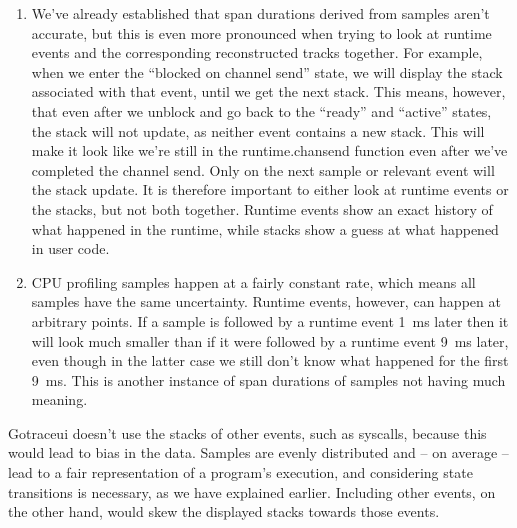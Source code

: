 \documentclass[10pt,letterpaper,oneside,openany,showtrims,draft]{memoir}
\newcommand{\code}[1]{{\ttfamily\mbox{#1}}}
\begin{document}
\begin{enumerate}
\item We've already established that span durations derived from samples aren't accurate, but this is even more
  pronounced when trying to look at runtime events and the corresponding reconstructed tracks together. For
  example, when we enter the \enquote{blocked on channel send} state, we will display the stack associated with that
  event, until we get the next stack. This means, however, that even after we unblock and go back to the
  \enquote{ready} and \enquote{active} states, the stack will not update, as neither event contains a new stack. This
  will make it look like we're still in the \code{runtime.chansend} function even after we've completed the channel
  send. Only on the next sample or relevant event will the stack update. It is therefore important to either look at
  runtime events or the stacks, but not both together. Runtime events show an exact history of what happened in
  the runtime, while stacks show a guess at what happened in user code.

\item CPU profiling samples happen at a fairly constant rate, which means all samples have the same uncertainty.
  Runtime events, however, can happen at arbitrary points. If a sample is followed by a runtime event \unit{1 ms}
  later then it will look much smaller than if it were followed by a runtime event \unit{9 ms} later, even though in
  the latter case we still don't know what happened for the first \unit{9 ms}. This is another instance of span
  durations of samples not having much meaning.
\end{enumerate}

Gotraceui doesn't use the stacks of other events, such as syscalls, because this would lead to bias in the data.
Samples are evenly distributed and – on average – lead to a fair representation of a program's execution, and
considering state transitions is necessary, as we have explained earlier. Including other events, on the other hand,
would skew the displayed stacks towards those events.


\backmatter
\end{document}
